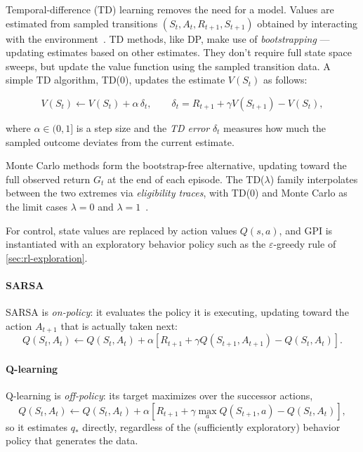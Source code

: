 Temporal-difference (TD) learning removes the need for a model.
Values are estimated from sampled transitions $(S_t,A_t,R_{t+1},S_{t+1})$ obtained by interacting with the environment~\cite{sutton_learning_1988,sutton_reinforcement_2020}.
TD methods, like DP, make use of \emph{bootstrapping} --- updating estimates based on other estimates.
They don't require full state space sweeps, but update the value function using the sampled transition data.
A simple TD algorithm, TD(0), updates the estimate $V(S_t)$ as follows:

\begin{equation}\label{eq:td0}
  V(S_t)\leftarrow V(S_t)+\alpha\,\delta_t,
  \qquad
  \delta_t=R_{t+1}+\gamma V(S_{t+1})-V(S_t),
\end{equation}

where $\alpha\in(0,1]$ is a step size and the \emph{TD error} $\delta_t$ measures how much the
sampled outcome deviates from the current estimate.

Monte Carlo methods form the bootstrap-free alternative, updating toward the full observed return
$G_t$ at the end of each episode.
The TD($\lambda$) family interpolates between the two extremes via \emph{eligibility traces},
with TD(0) and Monte Carlo as the limit cases $\lambda=0$ and
$\lambda=1$~\cite{sutton_learning_1988}.

For control, state values are replaced by action values $Q(s,a)$, and GPI is instantiated with an
exploratory behavior policy such as the $\varepsilon$-greedy rule of \cref{sec:rl-exploration}.

\paragraph{SARSA}
SARSA is \emph{on-policy}:
it evaluates the policy it is executing, updating toward the action $A_{t+1}$ that is actually
taken next:
\begin{equation}\label{eq:sarsa}
  Q(S_t,A_t)\leftarrow Q(S_t,A_t)+\alpha\left[R_{t+1}+\gamma Q(S_{t+1},A_{t+1})-Q(S_t,A_t)\right].
\end{equation}

\paragraph{Q-learning}
Q-learning is \emph{off-policy}:
its target maximizes over the successor actions,
\begin{equation}\label{eq:q-learning}
  Q(S_t,A_t)\leftarrow Q(S_t,A_t)+\alpha\left[R_{t+1}+\gamma\max_{a}Q(S_{t+1},a)-Q(S_t,A_t)\right],
\end{equation}
so it estimates $q_*$ directly, regardless of the (sufficiently exploratory) behavior policy that
generates the data.

